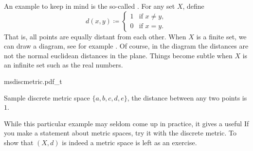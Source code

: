 \begin{example}
An example to keep in mind is the so-called
\emph{}.
For any set $X$, define
\begin{equation*}
d(x,y) \coloneqq
\begin{cases}
1 & \text{if } x \not= y, \\
0 & \text{if } x = y.
\end{cases}
\end{equation*}
That is, all points are equally distant from each other.  When $X$ is a
finite set, we can draw a diagram, see for example
.  Of course, in the diagram the distances 
are not the normal euclidean distances in the plane.
Things become subtle when $X$ is an infinite set such
as the real numbers.
\begin{myfigureht}
{msdiscmetric.pdf_t}
\caption{Sample discrete metric space $\{ a,b,c,d,e \}$, the distance
between any two points is $1$.\label{fig:msdiscmetric}}
\end{myfigureht}

While this particular
example may seldom come up in practice, it gives a useful 
  If you make a statement about metric spaces,
try it with the discrete metric.
To show that $(X,d)$ is indeed a metric space is left as an exercise.
\end{example}

